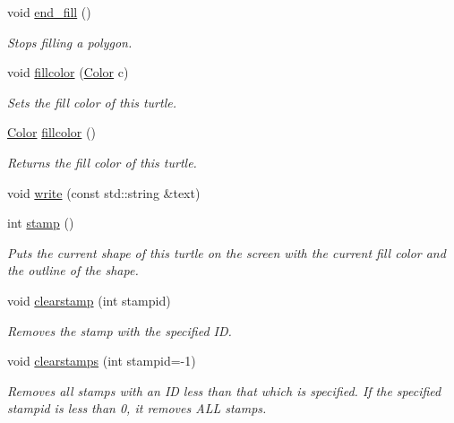 \begin{DoxyCompactItemize}
void \hyperlink{classcturtle_1_1Turtle_aaf0576f0492ba3c4b1afa5bea50b9ddb}{end\+\_\+fill} ()
\begin{DoxyCompactList}\small\item\em Stops filling a polygon. \end{DoxyCompactList}\item 
void \hyperlink{classcturtle_1_1Turtle_a222a95d61c5cfee661f5244e51d57539}{fillcolor} (\hyperlink{classcturtle_1_1Color}{Color} c)
\begin{DoxyCompactList}\small\item\em Sets the fill color of this turtle. \end{DoxyCompactList}\item 
\hyperlink{classcturtle_1_1Color}{Color} \hyperlink{classcturtle_1_1Turtle_aa35fb43f969187b513d5a1f443e98569}{fillcolor} ()
\begin{DoxyCompactList}\small\item\em Returns the fill color of this turtle. \end{DoxyCompactList}\item 
void \hyperlink{classcturtle_1_1Turtle_a6e814845ac619a90aeee25a67a3fc51d}{write} (const std\+::string \&text)
\item 
int \hyperlink{classcturtle_1_1Turtle_af7b7e9c43e22fabce3a5435d09c73f77}{stamp} ()
\begin{DoxyCompactList}\small\item\em Puts the current shape of this turtle on the screen with the current fill color and the outline of the shape. \end{DoxyCompactList}\item 
\mbox{\label{classcturtle_1_1Turtle_a9e1dea0d65c8cc1e4627e28b20390eb2}} 
void \hyperlink{classcturtle_1_1Turtle_a9e1dea0d65c8cc1e4627e28b20390eb2}{clearstamp} (int stampid)
\begin{DoxyCompactList}\small\item\em Removes the stamp with the specified ID. \end{DoxyCompactList}\item 
\mbox{\label{classcturtle_1_1Turtle_a92d143232f35dd3ff64af3236182442d}} 
void \hyperlink{classcturtle_1_1Turtle_a92d143232f35dd3ff64af3236182442d}{clearstamps} (int stampid=-\/1)
\begin{DoxyCompactList}\small\item\em Removes all stamps with an ID less than that which is specified. If the specified stampid is less than 0, it removes A\+LL stamps. \end{DoxyCompactList}\item 

\end{DoxyCompactItemize}
